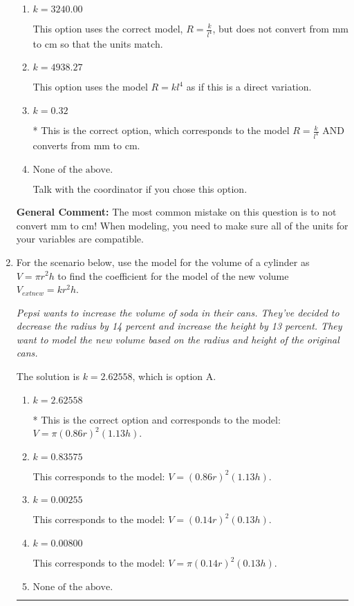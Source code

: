 \documentclass{extbook}[14pt]
\newcommand{\litem}[1]{\item #1

\rule{\textwidth}{0.4pt}}
\begin{document}
\begin{enumerate}
{\begin{enumerate}[label=\Alph*.]
This option uses the model $R = kl^{4}$ as if this is a direct variation AND does not convert from mm to cm so that the units match.
\item \( k = 3240.00 \)

This option uses the correct model, $R = \frac{k}{l^{4}}$, but does not convert from mm to cm so that the units match.
\item \( k = 4938.27 \)

This option uses the model $R = kl^{4}$ as if this is a direct variation.
\item \( k = 0.32 \)

* This is the correct option, which corresponds to the model $R = \frac{k}{l^{4}}$ AND converts from mm to cm.
\item \( \text{None of the above.} \)

Talk with the coordinator if you chose this option.
\end{enumerate}

\textbf{General Comment:} The most common mistake on this question is to not convert mm to cm! When modeling, you need to make sure all of the units for your variables are compatible.
}
\litem{
For the scenario below, use the model for the volume of a cylinder as $V = \pi r^2 h$ to find the coefficient for the model of the new volume $V_{	ext{new}} = k r^2 h$.

\begin{center}
    \textit{ Pepsi wants to increase the volume of soda in their cans. They've decided to decrease the radius by 14 percent and increase the height by 13 percent. They want to model the new volume based on the radius and height of the original cans. }
\end{center}
The solution is \( k = 2.62558 \), which is option A.\begin{enumerate}[label=\Alph*.]
\item \( k = 2.62558 \)

* This is the correct option and corresponds to the model: $V = \pi (0.86 r)^2 (1.13 h)$.
\item \( k = 0.83575 \)

This corresponds to the model: $V = (0.86 r)^2 (1.13 h)$.
\item \( k = 0.00255 \)

This corresponds to the model: $V = (0.14 r)^2 (0.13 h)$.
\item \( k = 0.00800 \)

This corresponds to the model: $V = \pi (0.14 r)^2 (0.13 h)$.
\item \( \text{None of the above.} \)


\end{enumerate}}
\end{enumerate}
\end{document}
